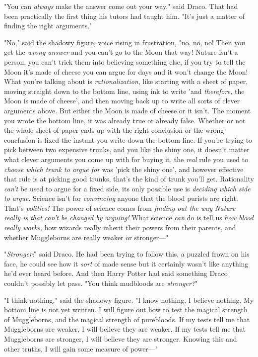 "You can \emph{always} make the answer come out your way," said Draco. That had 
been practically the first thing his tutors had taught him. "It's just a matter 
of finding the right arguments."

"No," said the shadowy figure, voice rising in frustration, "no, no, no! Then 
you get the \emph{wrong answer} and you can't go to the Moon that way! Nature 
isn't a person, you can't trick them into believing something else, if you try 
to tell the Moon it's made of cheese you can argue for days and it won't change 
the Moon! What you're talking about is \emph{rationalization}, like starting 
with a sheet of paper, moving straight down to the bottom line, using ink to 
write 'and \emph{therefore,} the Moon is made of cheese', and then moving back 
up to write all sorts of clever arguments above. But either the Moon is made of 
cheese or it isn't. The moment you wrote the bottom line, it was already true 
or already false. Whether or not the whole sheet of paper ends up with the 
right conclusion or the wrong conclusion is fixed the instant you write down 
the bottom line. If you're trying to pick between two expensive trunks, and you 
like the shiny one, it doesn't matter what clever arguments you come up with 
for buying it, the \emph{real} rule you used to \emph{choose which trunk to 
argue for} was 'pick the shiny one', and however effective that rule is at 
picking good trunks, that's the kind of trunk you'll get. Rationality 
\emph{can't} be used to argue for a fixed side, its only possible use is 
\emph{deciding which side to argue}. Science isn't for \emph{convincing} anyone 
that the blood purists are right. That's \emph{politics!} The power of science 
comes from \emph{finding out the way Nature really is that can't be changed by 
arguing!} What science \emph{can} do is tell us \emph{how blood really works,} 
how wizards really inherit their powers from their parents, and whether 
Muggleborns are really weaker or stronger---"

"\emph{Stronger!}" said Draco. He had been trying to follow this, a puzzled 
frown on his face, he could see how it \emph{sort} of made sense but it 
certainly wasn't like anything he'd ever heard before. And then Harry Potter 
had said something Draco couldn't possibly let pass. "You think mudbloods are 
\emph{stronger?}"

"I think nothing," said the shadowy figure. "I know nothing. I believe nothing. 
My bottom line is not yet written. I will figure out how to test the magical 
strength of Muggleborns, and the magical strength of purebloods. If my tests 
tell me that Muggleborns are weaker, I will believe they are weaker. If my 
tests tell me that Muggleborns are stronger, I will believe they are stronger. 
Knowing this and other truths, I will gain some measure of power---"

